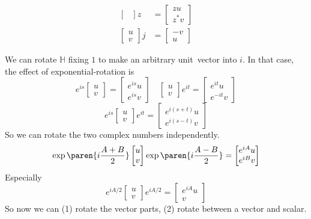 \documentclass{scrartcl}
\newcommand{\ham}{\mathbb H}
\begin{document}
\begin{multicols*}{2}
\begin{minipage}{.5\linewidth}
\begin{align*}
\begin{bmatrix}
    \end{bmatrix} z &=
                      \begin{bmatrix}
                        zu \\  z^*v
                      \end{bmatrix} \\
    \begin{bmatrix}
      u \\ v
    \end{bmatrix} j &=
                      \begin{bmatrix}
                        -v \\ u
                      \end{bmatrix}
  \end{align*}
\end{minipage}
We can rotate \(\ham\) fixing \(1\) to make an arbitrary unit~vector into \(i\). In that case, the effect of exponential-rotation is
\[
  e^{is}
  \begin{bmatrix}
    u \\ v
  \end{bmatrix}
  =
  \begin{bmatrix}
    e^{is} u \\ e^{is} v
  \end{bmatrix}
  \quad
  \begin{bmatrix}
    u \\v
  \end{bmatrix}
  e^{it} =
  \begin{bmatrix}
    e^{it} u \\ e^{-it} v
  \end{bmatrix}
\]
\[
  e^{is}
  \begin{bmatrix}
    u \\ v
  \end{bmatrix}
  e^{it}
  =
  \begin{bmatrix}
    e^{i(s+t)} u \\ e^{i(s-t)} v
  \end{bmatrix}
\]
So we can rotate the two complex numbers independently.
\[
  \exp\paren{i\frac{A+ B}2}
  \begin{bmatrix}
    u \\ v
  \end{bmatrix}
  \exp \paren{i\frac{A-B}2}
  =
  \begin{bmatrix}
    e^{iA} u \\ e^{iB}v
  \end{bmatrix}
\]
Especially
\[
  e^{iA/2}
  \begin{bmatrix}
    u \\v
  \end{bmatrix}
  e^{iA/2}
  =
  \begin{bmatrix}
    e^{iA} u \\ v
  \end{bmatrix}
\]
So now we can (1) rotate the vector parts, (2) rotate between a vector and scalar.


\end{multicols*}
\end{document}

